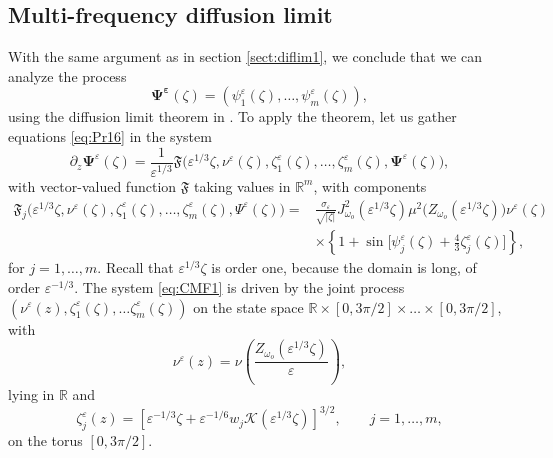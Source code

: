 \documentclass[final]{siamltex}
\begin{document}
\subsection{Multi-frequency diffusion limit}
\label{ap:diflimit2}
With the same argument as in section \ref{sect:diflim1}, we conclude
that we can analyze the process
\begin{equation}
\boldsymbol{\Psi^{\varepsilon}}(\zeta) = \left(\psi_1^{\varepsilon}(\zeta), \ldots,
\psi_m^{\varepsilon}(\zeta)\right),
\end{equation}
using the diffusion limit theorem in \cite[section
  III]{kim1996uniform}. 
To apply the theorem, let us gather equations \eqref{eq:Pr16} in the
system
\begin{equation}
\partial_z \boldsymbol{\Psi}^{\varepsilon}(\zeta) = \frac{1}{{\varepsilon}^{1/3}}
\boldsymbol{\mathfrak{F}}\big({\varepsilon}^{1/3} \zeta, \nu^{\varepsilon}(\zeta),
\zeta_1^{\varepsilon}(\zeta), \ldots,
\zeta_m^{\varepsilon}(\zeta),\boldsymbol{\Psi}^{\varepsilon}(\zeta)\big), \label{eq:CMF1}
\end{equation}
with vector-valued function $\boldsymbol{\mathfrak{F}}$ taking values in
$\mathbb{R}^m$, with components 
\begin{align}
\mathfrak{F}_j\big({\varepsilon}^{1/3} \zeta, \nu^{\varepsilon}(\zeta),
\zeta_1^{\varepsilon}(\zeta), \ldots, \zeta_m^{\varepsilon}(\zeta),\Psi^{\varepsilon}(\zeta)\big)
= &\frac{\sigma_{\varepsilon}}{ \sqrt{|\zeta|}} J_{{\omega}_o}^2({\varepsilon}^{1/3} \zeta)
\mu^2 \big(Z_{{\omega}_o}({\varepsilon}^{1/3} \zeta)\big) \nu^{\varepsilon}(\zeta) \nonumber
\\ &\times \left\{ 1 + \sin \Big[ \psi_j^{\varepsilon}(\zeta) +
  \frac{4}{3}\zeta_j^{\varepsilon}(\zeta)\Big]\right\}, \label{eq:CMF2}
\end{align}
for $j = 1, \ldots, m$. Recall that ${\varepsilon}^{1/3} \zeta$ is order one,
because the domain is long, of order ${\varepsilon}^{-1/3}$. The system
\eqref{eq:CMF1} is driven by the joint process $\left(\nu^{\varepsilon}(z),
\zeta_1^{\varepsilon}(\zeta), \ldots \zeta_{m}^{\varepsilon}(\zeta) \right)$ on the state
space $\mathbb{R} \times [0,3 \pi/2] \times \ldots \times [0,3
  \pi/2]$, with
\begin{equation}
\nu^{\varepsilon}(z) = \nu \left(\frac{Z_{{\omega}_o}({\varepsilon}^{1/3} \zeta)}{\varepsilon} \right),
\end{equation}
lying in $\mathbb{R}$ and
\begin{equation}
\zeta_j^{\varepsilon}(z) = \left[ {\varepsilon}^{-1/3} \zeta + {\varepsilon}^{-1/6} w_j
  \mathcal{K}({\varepsilon}^{1/3} \zeta)\right]^{3/2}, \qquad j = 1, \ldots, m,
\end{equation}
on the torus $[0,3 \pi/2]$. 
\end{document}

